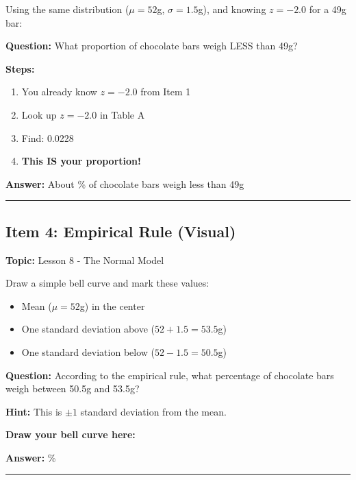 \documentclass[11pt]{article}
\begin{document}
Using the same distribution ($\mu = 52$g, $\sigma = 1.5$g), and knowing $z = -2.0$ for a 49g bar:

\textbf{Question:} What proportion of chocolate bars weigh LESS than 49g?

\textbf{Steps:}
\begin{enumerate}
    \item You already know $z = -2.0$ from Item 1
    \item Look up $z = -2.0$ in Table A
    \item Find: 0.0228
    \item \textbf{This IS your proportion!}
\end{enumerate}

\textbf{Answer:} About \underline{\hspace{1in}} \% of chocolate bars weigh less than 49g

\vspace{1in}

\hrule

\newpage

\subsection*{Item 4: Empirical Rule (Visual)}
\textbf{Topic:} Lesson 8 - The Normal Model

Draw a simple bell curve and mark these values:
\begin{itemize}
    \item Mean ($\mu = 52$g) in the center
    \item One standard deviation above ($52 + 1.5 = 53.5$g)
    \item One standard deviation below ($52 - 1.5 = 50.5$g)
\end{itemize}

\textbf{Question:} According to the empirical rule, what percentage of chocolate bars weigh between 50.5g and 53.5g?

\textbf{Hint:} This is $\pm 1$ standard deviation from the mean.

\textbf{Draw your bell curve here:}

\vspace{2in}

\textbf{Answer:} \underline{\hspace{1in}} \%

\vspace{0.2in}

\hrule

\vspace{0.2in}
\end{document}
